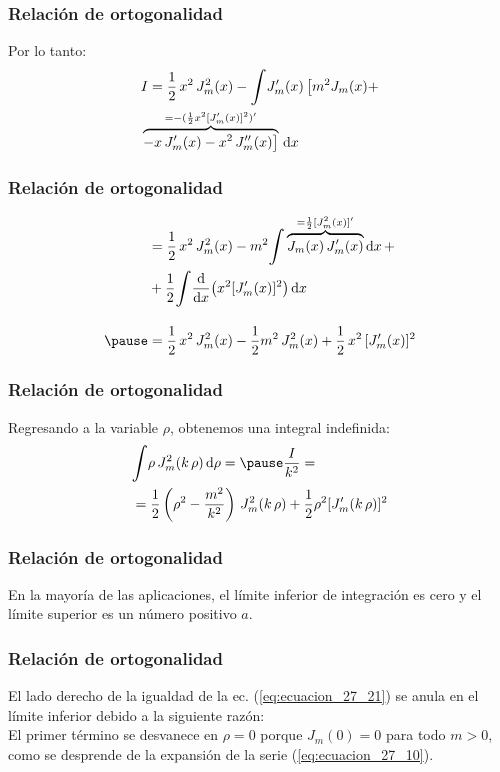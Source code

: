 \documentclass[12pt]{beamer}
\begin{document}
\begin{frame}
\frametitle{Relación de ortogonalidad}
Por lo tanto:
\begin{eqnarray*}
\begin{aligned}
&I = \dfrac{1}{2} \, x^{2} \, J_{m}^{2} (x) - \scaleint{6ex} \pderivada{J}_{m}(x) \, \big[ m^{2} J_{m}(x) + \\
&{}\overbrace{- x \, \pderivada{J}_{m} (x) - x^{2} \, \sderivada{J}_{m} (x) \big ]}^{=-(\frac{1}{2} x^{2} [\pderivada{J}_{m} (x)]^{2})^{\prime}} \, \dd{x} 
\end{aligned}
\end{eqnarray*}
\end{frame}
\begin{frame}
\frametitle{Relación de ortogonalidad}
\begin{eqnarray*}
\begin{aligned}
&= \dfrac{1}{2} \, x^{2} \, J_{m}^{2} (x) - m^{2} \scaleint{6ex} \overbrace{J_{m} (x) \, \pderivada{J}_{m} (x)}^{=\frac{1}{2} [J_{m}^{2}(x)]^{\prime}} \dd{x} + \\ 
&+ \dfrac{1}{2} \scaleint{6ex} \dv{x} (x^{2} [\pderivada{J}_{m} (x)]^{2}) \dd{x} \\[1em] \pause 
&= \dfrac{1}{2} \, x^{2} \, J_{m}^{2} (x) - \dfrac{1}{2} m^{2} \, J_{m}^{2} (x) + \dfrac{1}{2} \, x^{2} \, [\pderivada{J}_{m}(x)]^{2}
\end{aligned}
\end{eqnarray*}
\end{frame}
\begin{frame}
\frametitle{Relación de ortogonalidad}
Regresando a la variable $\rho$, obtenemos una integral indefinida:
\pause
\begin{eqnarray}
\begin{aligned}[b]
&\scaleint{6ex} \rho \, J_{m}^{2} ( k \, \rho) \dd{\rho} = \pause \dfrac{I}{k^{2}} = \\
&= \dfrac{1}{2} \left(\rho^{2} - \dfrac{m^{2}}{k^{2}} \right) \, J_{m}^{2} (k \, \rho) + \dfrac{1}{2} \rho^{2} [\pderivada{J}_{m}(k \, \rho)]^{2}
\end{aligned}
\label{eq:ecuacion_27_21}
\end{eqnarray}
\end{frame}
\begin{frame}
\frametitle{Relación de ortogonalidad}
En la mayoría de las aplicaciones, el límite inferior de integración es cero y el límite superior es un número positivo $a$. 
\end{frame}
\begin{frame}
\frametitle{Relación de ortogonalidad}
El lado derecho de la igualdad de la ec. (\ref{eq:ecuacion_27_21}) se anula en el límite inferior debido a la siguiente razón: 
\\
\bigskip
\pause
El primer término se desvanece en $\rho = 0$ porque $J_{m} (0) = 0$ para todo $m > 0$, como se desprende de la expansión de la serie (\ref{eq:ecuacion_27_10}). 
\end{frame}
\end{document}
